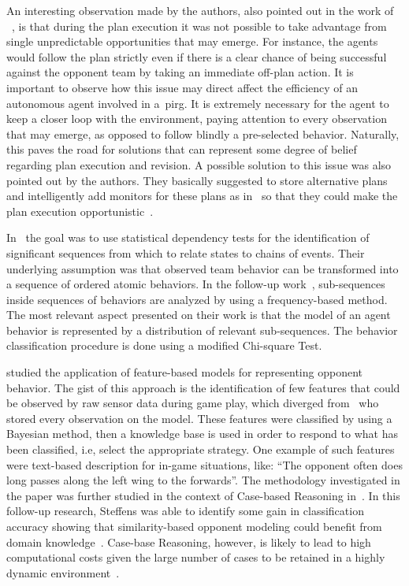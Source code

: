 An interesting observation made by the authors, also pointed out in the work of ~\cite{rofer_overview_2012}, is that during the plan execution it was not possible to take advantage from single unpredictable opportunities that may emerge. For instance, the agents would follow the plan strictly even if there is a clear chance of being successful against the opponent team by taking an immediate off-plan action. It is important to observe how this issue may direct affect the efficiency of an autonomous agent involved in a~\gls{pirg}. It is extremely necessary for the agent to keep a closer loop with the environment, paying attention to every observation that may emerge, as opposed to follow blindly a pre-selected behavior. Naturally, this paves the road for solutions that can represent some degree of belief regarding plan execution and revision. A possible solution to this issue was also pointed out by the authors. They basically suggested to store alternative plans and intelligently add monitors for these plans as in~\cite{veloso_rationale-based_1998} so that they could make the plan execution opportunistic~\citep{riley_coaching_2001,riley_planning_2002,rofer_overview_2012}.

In~\cite{iglesias_comparing_2006} the goal was to use statistical dependency tests for the identification of significant sequences from which to relate states to chains of events. Their underlying assumption was that observed team behavior can be transformed into a sequence of ordered atomic behaviors. In the follow-up work~\cite{burgard_classifying_2008}, sub-sequences inside sequences of behaviors are analyzed by using a frequency-based method. The most relevant aspect presented on their work is that the model of an agent behavior is represented by a distribution of relevant sub-sequences. The behavior classification procedure is done using a modified Chi-square Test.

\cite{steffens_feature-based_2003} studied the application of feature-based models for representing opponent behavior. The gist of this approach is the identification of few features that could be observed by raw sensor data during game play, which diverged from~\cite{fix_behavior_2000} who stored every observation on the model. These features were classified by using a Bayesian method, then a knowledge base is used in order to respond to what has been classified, i.e, select the appropriate strategy. One example of such features were text-based description for in-game situations, like: ``The opponent often does long passes along the left wing to the forwards''. The methodology investigated in the paper was further studied in the context of Case-based Reasoning in~\cite{steffens_similarity-based_2005}. In this follow-up research, Steffens was able to identify some gain in classification accuracy showing that similarity-based opponent modeling could benefit from domain knowledge~\citep{rofer_overview_2012}. Case-base Reasoning, however, is likely to lead to high computational costs given the large number of cases to be retained in a highly dynamic environment~\citep{ahmadi_using_2004,rofer_overview_2012}.


